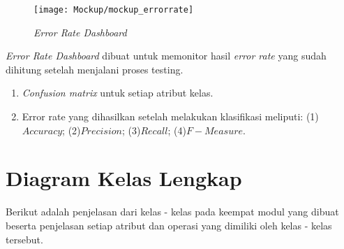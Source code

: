 \begin{figure}[H]
	\centering
	\texttt{[image: Mockup/mockup\_errorrate]}
	\caption[\textit{Error Rate Dashboard}]{\textit{Error Rate Dashboard}}
	\label{fig:Error Rate Dashboard}
\end{figure}
\textit{Error Rate Dashboard} dibuat untuk memonitor hasil \textit{error rate} yang sudah dihitung setelah menjalani proses testing. 
\begin{enumerate}
	\item \textit{Confusion matrix} untuk setiap atribut kelas.
	\item Error rate yang dihasilkan setelah melakukan klasifikasi meliputi: (1)$Accuracy$; (2)$Precision$; (3)$Recall$; (4)$F-Measure$.
\end{enumerate}



\section{Diagram Kelas Lengkap}
Berikut adalah penjelasan dari kelas - kelas pada keempat modul yang dibuat beserta penjelasan setiap atribut dan operasi yang dimiliki oleh kelas - kelas tersebut.

